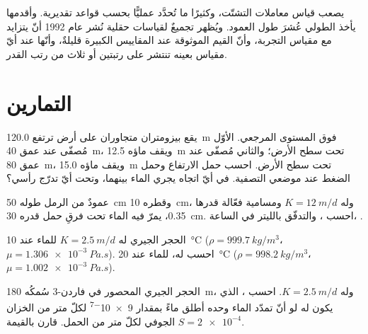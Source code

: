 يصعب قياس معاملات التشتّت، وكثيرًا ما تُحدَّد عمليًّا بحسب
قواعد تقديرية. وأقدمها يأخذ  الطولي عُشرَ
طول العمود. ويُظهر تجميعٌ لقياسات حقلية نُشر
عام 1992 أنّ  يتزايد مع مقياس التجربة،
وأنّ القيم الموثوقة عند المقاييس الكبيرة قليلةٌ، وأنّها عند أيّ مقياس بعينه
تنتشر على رتبتين أو ثلاث من رتب القدر.

\section{التمارين}

\begin{exercise}[$\star$]\label{exo:b3:hydrogeology:1}
يقع بيزومتران متجاوران على أرض ترتفع \qty{120.0}{m} فوق
المستوى المرجعي. الأوّل مُصفّى عند عمق \qty{40}{m}، ويقف ماؤه
\qty{12.5}{m} تحت سطح الأرض؛ والثاني مُصفّى عند عمق \qty{80}{m}،
ويقف ماؤه \qty{15.0}{m} تحت سطح الأرض. احسب حمل الارتفاع
وحمل الضغط  عند موضعي التصفية. في أيّ اتجاه يجري
الماء بينهما، وتحت أيّ تدرّج رأسي؟
\end{exercise}

\begin{exercise}[$\star$]\label{exo:b3:hydrogeology:2}
عمودٌ من الرمل طوله \qty{50}{cm} وقطره \qty{10}{cm}، وله $K =
\qty{12}{m/d}$ ومسامية فعّالة قدرها 0.35، يمرّ فيه الماء تحت
فرقِ حمل قدره \qty{30}{cm}. احسب ، والتدفّق
بالليتر في الساعة، .
\end{exercise}

\begin{exercise}[$\star$]\label{exo:b3:hydrogeology:3}
الحجر الجيري له $K = \qty{2.5}{m/d}$ للماء عند \qty{10}{\celsius}
($\rho = \qty{999.7}{kg/m^3}$، $\mu = \qty{1.306e-3}{Pa.s}$). احسب
 له،  للماء عند
\qty{20}{\celsius} ($\rho = \qty{998.2}{kg/m^3}$، $\mu =
\qty{1.002e-3}{Pa.s}$).
\end{exercise}

\begin{exercise}[$\star$]\label{exo:b3:hydrogeology:4}
الحجر الجيري المحصور في فاردن-3 سُمكُه \qty{180}{m}، وله $K =
\qty{2.5}{m/d}$. احسب ،  الذي يكون له
لو أنّ تمدّد الماء وحده أطلق ماءً بمقدار \num{9e-7} لكلّ متر من الخزان الجوفي
لكلّ متر من الحمل. قارن بالقيمة $S = \num{2e-4}$.
\end{exercise}

